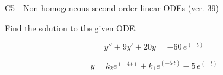 \begin{exercise}
  \begin{exerciseTitle}C5 - Non-homogeneous second-order linear ODEs (ver. 39)\end{exerciseTitle}
  \begin{exerciseStatement}
    
Find the solution to the given ODE.

    
\[y''+9y'+20y = -60 \, e^{\left(-t\right)}\]

  \end{exerciseStatement}
  \begin{exerciseAnswer}
    
\[y= k_{2} e^{\left(-4 \, t\right)} + k_{1} e^{\left(-5 \, t\right)} - 5 \, e^{\left(-t\right)}\]

  \end{exerciseAnswer}
\end{exercise}